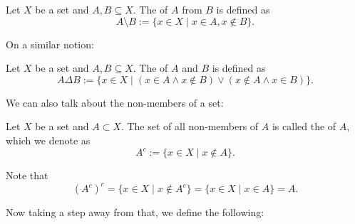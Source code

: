\documentclass[notoc,notitlepage]{tufte-book}
\begin{document}
\begin{defn}\label{defn:set_difference}
  Let $X$ be a set and $A, B \subseteq X$. The  of $A$ from $B$ is defined as
  \begin{equation*}
    A \setminus B := \{ x \in X \mid x \in A, x \notin B \}.
  \end{equation*}
\end{defn}

On a similar notion:

\begin{defn}\label{defn:symmetric_difference}
Let $X$ be a set and $A, B \subseteq X$. The  of $A$ and $B$ is defined as
  \begin{equation*}
    A \Delta B := \{ x \in X \mid ( x \in A \land x \notin B ) \lor ( x \notin A \land x \in B ) \}.
  \end{equation*}
\end{defn}

We can also talk about the non-members of a set:

\begin{defn}\label{defn:set_complement}
  Let $X$ be a set and $A \subset X$. The set of all non-members of $A$ is called the  of $A$, which we denote as
  \begin{equation*}
    A^c := \{ x \in X \mid x \notin A \}.
  \end{equation*}
\end{defn}

\begin{note}
  Note that
  \begin{equation*}
    {\left( A^c \right)}^c = \{ x \in X \mid x \notin A^c \} = \{ x \in X \mid x \in A \} = A.
  \end{equation*}
\end{note}

Now taking a step away from that, we define the following:
\end{document}
